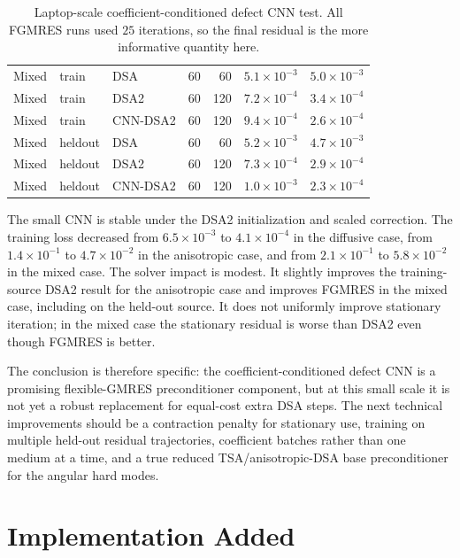 \documentclass[11pt]{article}
\begin{document}
\begin{table}[t]
\begin{tabular}{lllrrrr}
Mixed & train & DSA & 60 & 60 & \(5.1{\times}10^{-3}\) & \(5.0{\times}10^{-3}\)\\
Mixed & train & DSA2 & 60 & 120 & \(7.2{\times}10^{-4}\) & \(3.4{\times}10^{-4}\)\\
Mixed & train & CNN-DSA2 & 60 & 120 & \(9.4{\times}10^{-4}\) & \(2.6{\times}10^{-4}\)\\
Mixed & heldout & DSA & 60 & 60 & \(5.2{\times}10^{-3}\) & \(4.7{\times}10^{-3}\)\\
Mixed & heldout & DSA2 & 60 & 120 & \(7.3{\times}10^{-4}\) & \(2.9{\times}10^{-4}\)\\
Mixed & heldout & CNN-DSA2 & 60 & 120 & \(1.0{\times}10^{-3}\) & \(2.3{\times}10^{-4}\)\\
\bottomrule
\end{tabular}
\caption{Laptop-scale coefficient-conditioned defect CNN test.  All FGMRES
runs used \(25\) iterations, so the final residual is the more informative
quantity here.}
\label{tab:defect-cnn-small}
\end{table}

The small CNN is stable under the DSA2 initialization and scaled correction.
The training loss decreased from \(6.5\times10^{-3}\) to \(4.1\times10^{-4}\)
in the diffusive case, from \(1.4\times10^{-1}\) to \(4.7\times10^{-2}\) in the
anisotropic case, and from \(2.1\times10^{-1}\) to \(5.8\times10^{-2}\) in the
mixed case.  The solver impact is modest.  It slightly improves the
training-source DSA2 result for the anisotropic case and improves FGMRES in the
mixed case, including on the held-out source.  It does not uniformly improve
stationary iteration; in the mixed case the stationary residual is worse than
DSA2 even though FGMRES is better.

The conclusion is therefore specific: the coefficient-conditioned defect CNN is
a promising flexible-GMRES preconditioner component, but at this small scale it
is not yet a robust replacement for equal-cost extra DSA steps.  The next
technical improvements should be a contraction penalty for stationary use,
training on multiple held-out residual trajectories, coefficient batches rather
than one medium at a time, and a true reduced TSA/anisotropic-DSA base
preconditioner for the angular hard modes.

\section{Implementation Added}
\end{document}

